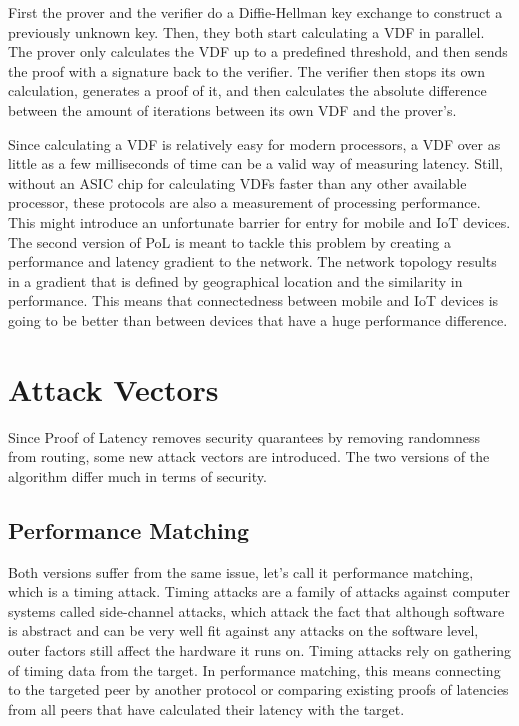 First the prover and the verifier do a Diffie-Hellman key exchange to construct a previously unknown key. Then, they both start calculating a VDF in parallel. The prover only calculates the VDF up to a predefined threshold, and then sends the proof with a signature back to the verifier. The verifier then stops its own calculation, generates a proof of it, and then calculates the absolute difference between the amount of iterations between its own VDF and the prover's.

Since calculating a VDF is relatively easy for modern processors, a VDF over as little as a few milliseconds of time can be a valid way of measuring latency. Still, without an ASIC chip for calculating VDFs faster than any other available processor, these protocols are also a measurement of processing performance. This might introduce an unfortunate barrier for entry for mobile and IoT devices. The second version of PoL is meant to tackle this problem by creating a performance and latency gradient to the network. The network topology results in a gradient that is defined by geographical location and the similarity in performance. This means that connectedness between mobile and IoT devices is going to be better than between devices that have a huge performance difference.

\section{Attack Vectors}
Since Proof of Latency removes security quarantees by removing randomness from routing, some new attack vectors are introduced. The two versions of the algorithm differ much in terms of security.

\subsection{Performance Matching}
Both versions suffer from the same issue, let's call it performance matching, which is a timing attack. Timing attacks are a family of attacks against computer systems called side-channel attacks, which attack the fact that although software is abstract and can be very well fit against any attacks on the software level, outer factors still affect the hardware it runs on. Timing attacks rely on gathering of timing data from the target.\cite{noauthor_undated-mp} In performance matching, this means connecting to the targeted peer by another protocol or comparing existing proofs of latencies from all peers that have calculated their latency with the target.

